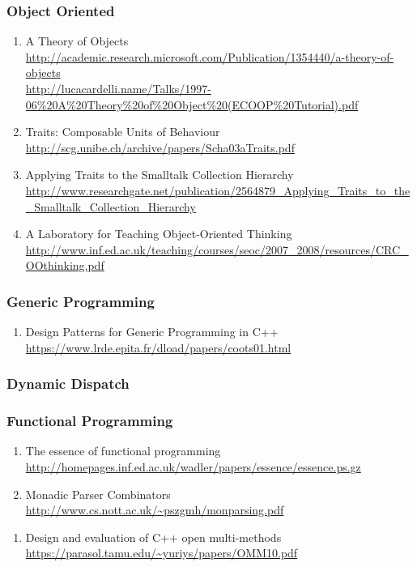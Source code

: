 \documentclass{article}
\begin{document}
\subsubsection{Object Oriented}
\begin{enumerate}
	\item {A Theory of Objects\\
\url{http://academic.research.microsoft.com/Publication/1354440/a-theory-of-objects}\\
\url{http://lucacardelli.name/Talks/1997-06\%20A\%20Theory\%20of\%20Object\%20(ECOOP\%20Tutorial).pdf}}
	\item {Traits: Composable Units of Behaviour\\
\url{http://scg.unibe.ch/archive/papers/Scha03aTraits.pdf}}
	\item {Applying Traits to the Smalltalk Collection Hierarchy\\
\url{http://www.researchgate.net/publication/2564879_Applying_Traits_to_the_Smalltalk_Collection_Hierarchy}}
	\item {A Laboratory for Teaching Object-Oriented Thinking\\
\url{http://www.inf.ed.ac.uk/teaching/courses/seoc/2007_2008/resources/CRC_OOthinking.pdf}}
\end{enumerate}
\subsubsection{Generic Programming}
	\begin{enumerate}
	\item {Design Patterns for Generic Programming in C++\\ \url{https://www.lrde.epita.fr/dload/papers/coots01.html}}
	\end{enumerate}
\subsubsection{Dynamic Dispatch}
\subsubsection{Functional Programming}
\begin{enumerate}
	\item{The essence of functional programming \\
\url{http://homepages.inf.ed.ac.uk/wadler/papers/essence/essence.ps.gz}}
	\item {Monadic Parser Combinators\\
\url{http://www.cs.nott.ac.uk/~pszgmh/monparsing.pdf}}
\end{enumerate}
\begin{enumerate}
	\item {Design and evaluation of C++ open multi-methods\\
\url{https://parasol.tamu.edu/~yuriys/papers/OMM10.pdf}}
\end{enumerate}
\end{document}
